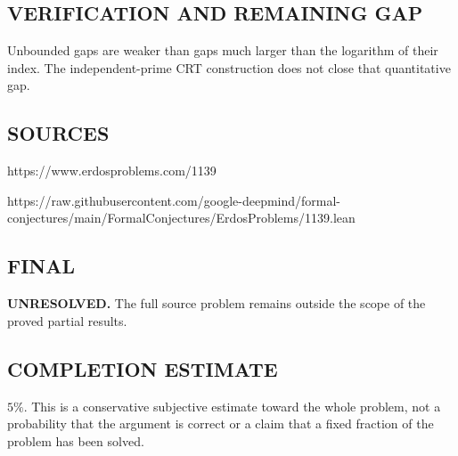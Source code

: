 \subsection*{VERIFICATION AND REMAINING GAP}
Unbounded gaps are weaker than gaps much larger than the logarithm of their
index. The independent-prime CRT construction does not close that quantitative gap.

\subsection*{SOURCES}
https://www.erdosproblems.com/1139

https://raw.githubusercontent.com/google-deepmind/formal-conjectures/main/FormalConjectures/ErdosProblems/1139.lean

\subsection*{FINAL}
\textbf{UNRESOLVED.} The full source problem remains outside the scope of the proved partial results.

\subsection*{COMPLETION ESTIMATE}
$5\%$. This is a conservative subjective estimate toward the whole problem, not a probability that the argument is correct or a claim that a fixed fraction of the problem has been solved.
